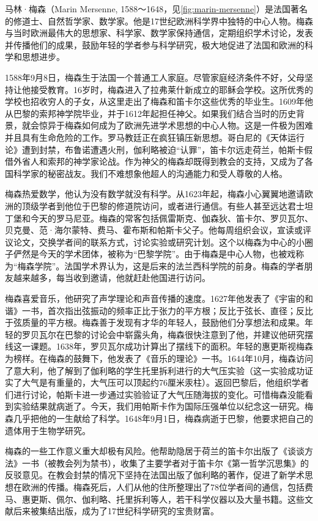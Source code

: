 \documentclass[b5paper]{ctexart}
\begin{document}
\begin{mdframed}
马林·梅森（Marin Mersenne, 1588～1648，见\cref{fig:marin-mersenne}）是法国著名的修道士、自然哲学家、数学家。他是17世纪欧洲科学界中独特的中心人物。梅森与当时欧洲最伟大的思想家、科学家、数学家保持通信，定期组织学术讨论，发表并传播他们的成果，鼓励年轻的学者参与科学研究，极大地促进了法国和欧洲的科学和思想进步。

1588年9月8日，梅森生于法国一个普通工人家庭。尽管家庭经济条件不好，父母坚持让他接受教育。16岁时，梅森进入了拉弗莱什新成立的耶稣会学校。这所优秀的学校也招收穷人的子女，从这里走出了梅森和笛卡尔这些优秀的毕业生。1609年他从巴黎的索邦神学院毕业，并于1612年起担任神父。如果我们结合当时的历史背景，就会惊异于梅森如何成为了欧洲先进学术思想的中心人物。这是一件极为困难并且具有生命危险的工作。罗马教廷正在疯狂镇压新思想。哥白尼的《天体运行论》遭到封禁，布鲁诺遭遇火刑，伽利略被迫“认罪”，笛卡尔远走荷兰，帕斯卡假借外省人和索邦的神学家论战\footnotemark。作为神父的梅森却既得到教会的支持，又成为了各国科学家的秘密战友。我们不难想象他超人的沟通能力和受人尊敬的人格。

梅森热爱数学，他认为没有数学就没有科学。从1623年起，梅森小心翼翼地邀请欧洲的顶级学者到他位于巴黎的修道院访问，或者进行通信。有些人甚至远达君士坦丁堡和今天的罗马尼亚。梅森的常客包括佩雷斯克、伽森狄、笛卡尔、罗贝瓦尔、贝克曼、范·海尔蒙特、费马、霍布斯和帕斯卡父子。他每周组织会议，宣读或评议论文，交换学者间的联系方式，讨论实验或研究计划。这个以梅森为中心的小圈子俨然是今天的学术团体，被称为“巴黎学院”。由于梅森是中心人物，也被戏称为“梅森学院”。法国学术界认为，这是后来的法兰西科学院的前身。梅森的学者朋友越来越多，每当收到邀请，他就赶赴他国进行访问。

梅森喜爱音乐，他研究了声学理论和声音传播的速度。1627年他发表了《宇宙的和谐》一书，首次指出弦振动的频率正比于张力的平方根；反比于弦长、直径；反比于弦质量的平方根。梅森善于发现有才华的年轻人，鼓励他们分享想法和成果。年轻的罗贝瓦尔在巴黎的讨论会中崭露头角，梅森很快注意到了他，并建议他研究摆线这一课题。1638年，罗贝瓦尔成功计算出了摆线下的面积。年轻的惠更斯视梅森为榜样。在梅森的鼓舞下，他发表了《音乐的理论》一书。1644年10月，梅森访问了意大利，他了解到了伽利略的学生托里拆利进行的大气压实验（这一实验成功证实了大气是有重量的，大气压可以顶起约76厘米汞柱）。返回巴黎后，他组织学者们进行讨论，帕斯卡进一步通过实验验证了大气压随海拔的变化。可惜梅森没能看到实验结果就病逝了。今天，我们用帕斯卡作为国际压强单位以纪念这一研究。梅森几乎把他的一生献给了科学。1648年9月1日，梅森病逝于巴黎，他要求把自己的遗体用于生物学研究\cite{OConnor-Robertson-2005}。

梅森的一些工作意义重大却极有风险。他帮助隐居于荷兰的笛卡尔出版了《谈谈方法》一书（被教会列为禁书），收集了主要学者对于笛卡尔《第一哲学沉思集》的反驳意见。在教会封禁的情况下坚持在法国出版了伽利略的著作，促进了新学术思想在欧洲的传播\cite{Britannia-2024}。梅森死后，人们从他的住所整理出了78位学者间的通信，包括费马、惠更斯、佩尔、伽利略、托里拆利等人，若干科学仪器以及大量书籍。这些文献后来被集结出版，成为了17世纪科学研究的宝贵财富。
\end{mdframed}
\end{document}
